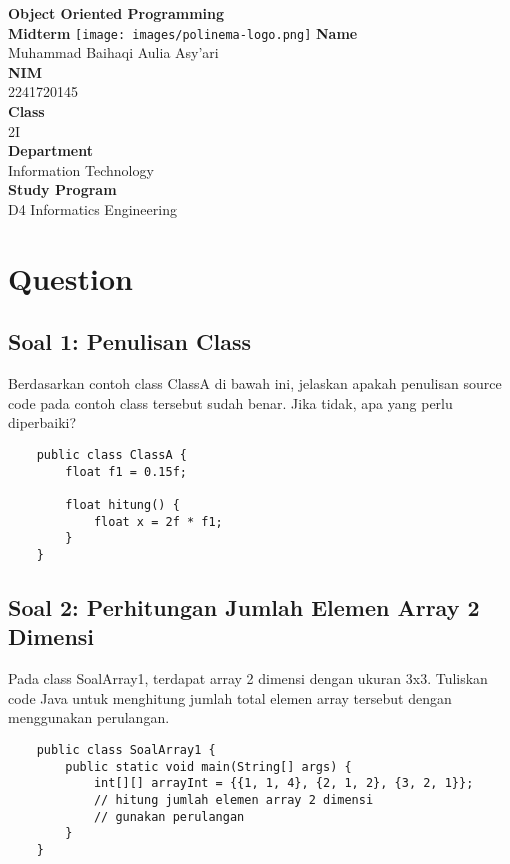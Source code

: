 \documentclass[12pt,titlepage]{article}
\newcommand{\vSubject}{Object Oriented Programming}
\newcommand{\vSubtitle}{Midterm}
\newcommand{\vName}{Muhammad Baihaqi Aulia Asy'ari}
\newcommand{\vNIM}{2241720145}
\newcommand{\vClass}{2I}
\newcommand{\vDepartment}{Information Technology}
\newcommand{\vStudyProgram}{D4 Informatics Engineering}
\begin{document}
\begin{titlepage}
    \centering
    \vfill
    {\bfseries\LARGE
        \vSubject\\
        \vskip0.25cm
        \vSubtitle
    }
    \vfill
    \texttt{[image: images/polinema-logo.png]}
    \vfill
    {
        \textbf{Name}\\
        \vName\\
        \vskip0.5cm
        \textbf{NIM}\\
        \vNIM\\
        \vskip0.5cm
        \textbf{Class}\\
        \vClass\\
        \vskip0.5cm
        \textbf{Department}\\
        \vDepartment\\
        \vskip0.5cm
        \textbf{Study Program}\\
        \vStudyProgram
    }
\end{titlepage}

\newpage

\section*{Question}

\subsection*{Soal 1: Penulisan Class}
\noindent
Berdasarkan contoh class ClassA di bawah ini, jelaskan apakah penulisan source code pada contoh class tersebut sudah benar. Jika tidak, apa yang perlu diperbaiki?
\begin{verbatim}
    public class ClassA {
        float f1 = 0.15f;

        float hitung() {
            float x = 2f * f1;
        }
    }
\end{verbatim}

\subsection*{Soal 2: Perhitungan Jumlah Elemen Array 2 Dimensi}
\noindent
Pada class SoalArray1, terdapat array 2 dimensi dengan ukuran 3x3. Tuliskan code Java untuk menghitung jumlah total elemen array tersebut dengan menggunakan perulangan.
\begin{verbatim}
    public class SoalArray1 {
        public static void main(String[] args) {
            int[][] arrayInt = {{1, 1, 4}, {2, 1, 2}, {3, 2, 1}};
            // hitung jumlah elemen array 2 dimensi
            // gunakan perulangan
        }
    }
\end{verbatim}
\end{document}

